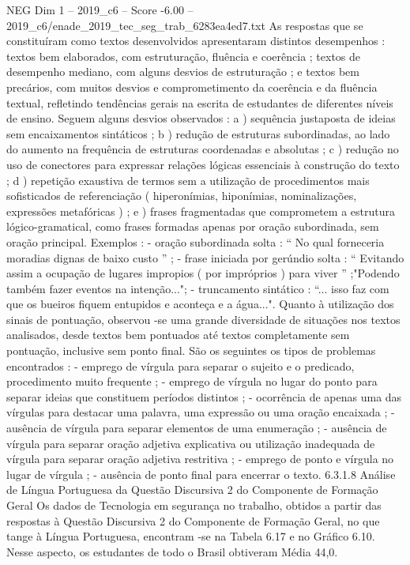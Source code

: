 \begin{textsample}{NEG Dim 1 – 2019\_c6 – Score -6.00 – 2019\_c6/enade\_2019\_tec\_seg\_trab\_6283ea4ed7.txt}
As respostas que se constituíram como textos desenvolvidos apresentaram distintos desempenhos : textos bem elaborados, com estruturação, fluência e coerência ; textos de desempenho mediano, com alguns desvios de estruturação ; e textos bem precários, com muitos desvios e comprometimento da coerência e da fluência textual, refletindo tendências gerais na escrita de estudantes de diferentes níveis de ensino.
Seguem alguns desvios observados : a ) sequência justaposta de ideias sem encaixamentos sintáticos ; b ) redução de estruturas subordinadas, ao lado do aumento na frequência de estruturas coordenadas e absolutas ; c ) redução no uso de conectores para expressar relações lógicas essenciais à construção do texto ; d ) repetição exaustiva de termos sem a utilização de procedimentos mais sofisticados de referenciação ( hiperonímias, hiponímias, nominalizações, expressões metafóricas ) ; e ) frases fragmentadas que comprometem a estrutura lógico-gramatical, como frases formadas apenas por oração subordinada, sem oração principal.
Exemplos : - oração subordinada solta : “ No qual forneceria moradias dignas de baixo custo ” ; - frase iniciada por gerúndio solta : “ Evitando assim a ocupação de lugares impropios ( por impróprios ) para viver ” ;"Podendo também fazer eventos na intenção..."; - truncamento sintático : “... isso faz com que os bueiros fiquem entupidos e aconteça e a água...".
Quanto à utilização dos sinais de pontuação, observou -se uma grande diversidade de situações nos textos analisados, desde textos bem pontuados até textos completamente sem pontuação, inclusive sem ponto final.
São os seguintes os tipos de problemas encontrados : - emprego de vírgula para separar o sujeito e o predicado, procedimento muito frequente ; - emprego de vírgula no lugar do ponto para separar ideias que constituem períodos distintos ; - ocorrência de apenas uma das vírgulas para destacar uma palavra, uma expressão ou uma oração encaixada ; - ausência de vírgula para separar elementos de uma enumeração ; - ausência de vírgula para separar oração adjetiva explicativa ou utilização inadequada de vírgula para separar oração adjetiva restritiva ; - emprego de ponto e vírgula no lugar de vírgula ; - ausência de ponto final para encerrar o texto. 6.3.1.8 Análise de Língua Portuguesa da Questão Discursiva 2 do Componente de Formação Geral Os dados de Tecnologia em segurança no trabalho, obtidos a partir das respostas à Questão Discursiva 2 do Componente de Formação Geral, no que tange à Língua Portuguesa, encontram -se na Tabela 6.17 e no Gráfico 6.10.
Nesse aspecto, os estudantes de todo o Brasil obtiveram Média 44,0.

\end{textsample}
